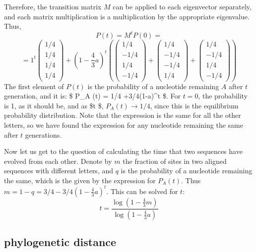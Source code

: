 \documentclass[
  letterpaper,
  DIV=11,
  numbers=noendperiod]{scrreprt}
\begin{document}
Therefore, the transition matrix \(M\) can be applied to each
eigenvector separately, and each matrix multiplication is a
multiplication by the appropriate eigenvalue. Thus,
\[ P(t) = M^t P(0) =  \]
\[ = 1^t \left(\begin{array}{c} 1/4 \\ 1/4 \\ 1/4 \\ 1/4 \end{array}\right) + (1-\frac{4}{3}a)^t\left( \left(\begin{array}{c} 1/4 \\ -1/4 \\ 1/4 \\ -1/4 \end{array}\right) +  \left(\begin{array}{c} 1/4 \\ -1/4 \\ -1/4 \\ 1/4 \end{array}\right) + \left(\begin{array}{c} 1/4 \\ -1/4 \\ 1/4 \\ -1/4 \end{array}\right) \right)\]
The first element of \(P(t)\) is the probability of a nucleotide
remaining \(A\) after \(t\) generation, and it is: \$ P\_A (t) = 1/4
+3/4(1-a)\^{}t \$. For \(t=0\), the probability is 1, as it
should be, and as \$t \rightarrow \infty \$,
\(P_A (t) \rightarrow 1/4\), since this is the equilibrium probability
distribution. Note that the expression is the same for all the other
letters, so we have found the expression for any nucleotide remaining
the same after \(t\) generations.

Now let us get to the question of calculating the time that two
sequences have evolved from each other. Denote by \(m\) the fraction of
sites in two aligned sequences with different letters, and \(q\) is the
probability of a nucleotide remaining the same, which is the given by
the expression for \(P_A(t)\). Thus
\(m = 1 - q = 3/4 - 3/4(1-\frac{4}{3}a)^t\). This can be solved for
\(t\):
\[ t = \frac{\log (1 -  \frac{4}{3} m)}{\log (1 -  \frac{4}{3} a)}\]

\hypertarget{phylogenetic-distance}{%
\subsection{phylogenetic distance}\label{phylogenetic-distance}}
\end{document}
